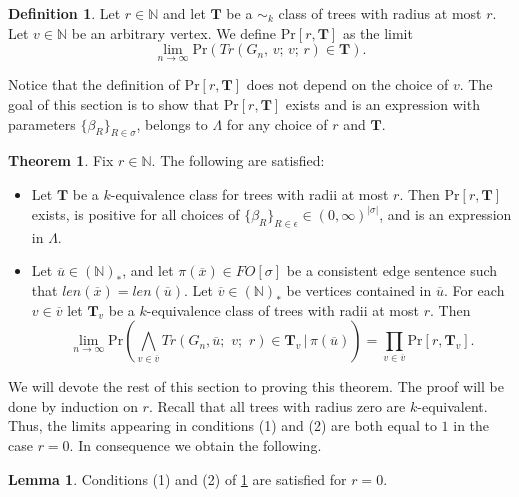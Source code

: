 \documentclass[12pt,notitlepage,a4paper]{article}
\theoremstyle{definition}
\newtheorem{theorem}{Theorem}[section]
\newtheorem{lemma}{Lemma}[section]
\newtheorem{definition}{Definition}[section]
\newcommand{\N}{\mathbb{N}}
\newcommand{\Ln}{\lim\limits_{n\to \infty}}
\begin{document}
\begin{definition}
	Let $r\in \N$ and let $\mathbf{T}$ be a $\sim_k$ class
	of trees with radius at most $r$. Let $v\in \N$ be an arbitrary 
	vertex. We define $\mathrm{Pr}[r,\mathbf{T}]$ as the limit
	\[
	\Ln \mathrm{Pr}\left(
	Tr(G_n,\,v;\,v;\,r)\in \mathbf{T}\right).
	\]
\end{definition}

Notice that the 
definition of  $\mathrm{Pr}[r,\mathbf{T}]$ does not depend on the
choice of $v$. The goal of this section is to show 
that $\mathrm{Pr}[r,\mathbf{T}]$ exists and is
an expression with parameters
$\{\beta_R\}_{R\in\sigma}$, belongs to $\Lambda$ 
for any choice of $r$ and $\mathbf{T}$. \par




\begin{theorem} \label{thm:BigTrees}
	Fix $r\in \N$. The following are satisfied:
	\begin{itemize}
		\item[(1)] Let $\mathbf{T}$ be a
		$k$-equivalence class for trees with radii at most $r$.	Then 
		$
		\mathrm{Pr}[r,\mathbf{T}]
		$
		exists,
		is positive for all choices of 
		$\{\beta_R\}_{R\in \epsilon}\in (0,\infty)^{|\sigma|}$,
		and is an expression
		in $\Lambda$.
		\item[(2)] Let $\overline{u}\in (\N)_*$,
		and let $\pi(\overline{x})\in FO[\sigma]$ be a consistent
		edge sentence such that 
		$len(\overline{x})=len(\overline{u})$.
		Let $\overline{v}\in (\N)_*$ be vertices contained
		in $\overline{u}$. For each $v\in \overline{v}$
		let $\mathbf{T}_v$ be a $k$-equivalence class
		of trees with radii	at most $r$. Then
		\[
		\Ln \mathrm{Pr}\left( \bigwedge_{v\in \overline{v}} 
		Tr\left(G_n, \overline{u};\,\,v;\,\,r\right)\in \mathbf{T}_v 
		\, | \, \pi(\overline{u})
		\right)= \prod_{v\in \overline{v}} \mathrm{Pr}[r,\mathbf{T}_v]. \]	 	
	\end{itemize}
\end{theorem}
We will devote the rest of this section to proving this
theorem. The proof will be done by induction on $r$. 
Recall that	all trees with radius zero are $k$-equivalent. Thus,
the limits appearing in conditions (1) and (2) are both equal to $1$
in the case $r=0$. In consequence we obtain the following. 

\begin{lemma}
	Conditions (1) and (2) of \cref{thm:BigTrees} 
	are satisfied for $r=0$.
\end{lemma}
\end{document}
